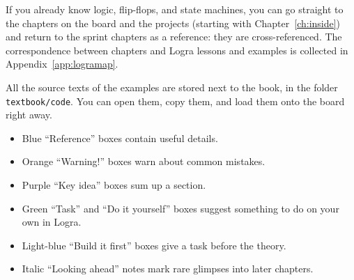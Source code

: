 If you already know logic, flip-flops, and state machines, you can go
straight to the chapters on the board and the projects (starting with
Chapter~\ref{ch:inside}) and return to the sprint chapters as a reference:
they are cross-referenced. The correspondence between chapters and Logra
lessons and examples is collected in Appendix~\ref{app:logramap}.

All the source texts of the examples are stored next to the book, in the
folder \nolinkurl{textbook/code}. You can open them, copy them, and load them
onto the board right away.

\begin{infobox}[Conventions]
\begin{itemize}
  \item Blue ``Reference'' boxes contain useful details.
  \item Orange ``Warning!'' boxes warn about common mistakes.
  \item Purple ``Key idea'' boxes sum up a section.
  \item Green ``Task'' and ``Do it yourself'' boxes suggest something to do
    on your own in Logra.
  \item Light-blue ``Build it first'' boxes give a task before the theory.
  \item Italic ``Looking ahead'' notes mark rare glimpses into later chapters.
\end{itemize}
\end{infobox}
